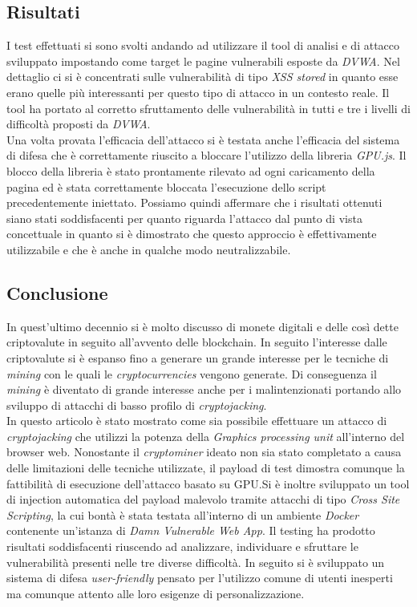 \documentclass[conference, italian]{IEEEtran}
\begin{document}
\subsection{Risultati}\label{sec:results}
I test effettuati si sono svolti andando ad utilizzare il tool di analisi e di attacco sviluppato impostando come target le pagine vulnerabili esposte da \emph{DVWA}. Nel dettaglio ci si è concentrati sulle vulnerabilità di tipo \emph{XSS stored} in quanto esse erano quelle più interessanti per questo tipo di attacco in un contesto reale. Il tool ha portato al corretto sfruttamento delle vulnerabilità in tutti e tre i livelli di difficoltà proposti da \emph{DVWA}.\\
Una volta provata l'efficacia dell'attacco si è testata anche l'efficacia del sistema di difesa che è correttamente riuscito a bloccare l'utilizzo della libreria \emph{GPU.js}. Il blocco della libreria è stato prontamente rilevato ad ogni caricamento della pagina ed è stata correttamente bloccata l'esecuzione dello script precedentemente iniettato.
Possiamo quindi affermare che i risultati ottenuti siano stati soddisfacenti per quanto riguarda l'attacco dal punto di vista concettuale in quanto si è dimostrato che questo approccio è effettivamente utilizzabile e che è anche in qualche modo neutralizzabile.

\subsection{Conclusione}\label{sec:conclusion}
In quest'ultimo decennio si è molto discusso di monete digitali e delle così dette criptovalute in seguito all'avvento delle blockchain. In seguito l'interesse dalle criptovalute si è espanso fino a generare un grande interesse per le tecniche di \emph{mining} con le quali le \emph{cryptocurrencies} vengono generate. Di conseguenza il \emph{mining} è diventato di grande interesse anche per i malintenzionati portando allo sviluppo di attacchi di basso profilo di \emph{cryptojacking}.\\
In questo articolo è stato mostrato come sia possibile effettuare un attacco di \emph{cryptojacking} che utilizzi la potenza della \emph{Graphics processing unit} all'interno del browser web. Nonostante il \emph{cryptominer} ideato non sia stato completato a causa delle limitazioni delle tecniche utilizzate, il payload di test dimostra comunque la fattibilità di esecuzione dell'attacco basato su GPU.\@ Si è inoltre sviluppato un tool di injection automatica del payload malevolo tramite attacchi di tipo \emph{Cross Site Scripting}, la cui bontà è stata testata all'interno di un ambiente \emph{Docker} contenente un'istanza di \emph{Damn Vulnerable Web App}. Il testing ha prodotto risultati soddisfacenti riuscendo ad analizzare, individuare e sfruttare le vulnerabilità presenti nelle tre diverse difficoltà. In seguito si è sviluppato un sistema di difesa \emph{user-friendly} pensato per l'utilizzo comune di utenti inesperti ma comunque attento alle loro esigenze di personalizzazione.
\end{document}
